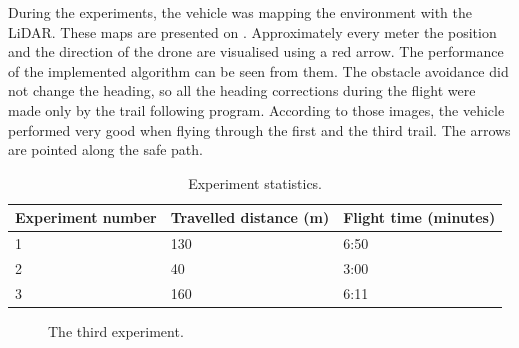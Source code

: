 During the experiments, the vehicle was mapping the environment with the \acs{LiDAR}. These maps are presented on . Approximately every meter the position and the direction of the drone are visualised using a red arrow. The performance of the implemented algorithm can be seen from them. The obstacle avoidance did not change the heading, so all the heading corrections during the flight were made only by the trail following program. According to those images, the vehicle performed very good when flying through the first and the third trail. The arrows are pointed along the safe path.

\begin{table}[]
\centering
\begin{tabular}{|l|l|l|}
\hline
Experiment number & Travelled distance (m) & Flight time (minutes) \\ \hline
1                 & 130                    & 6:50                  \\ \hline
2                 & 40                     & 3:00                  \\ \hline
3                 & 160                    & 6:11                  \\ \hline
\end{tabular}
\caption{Experiment statistics.}
\end{table}

\begin{figure}[!h]

  \centering

  \centering	
  


  \caption{The third experiment.}
  \label{fig:third_trail_photos}
\end{figure}


